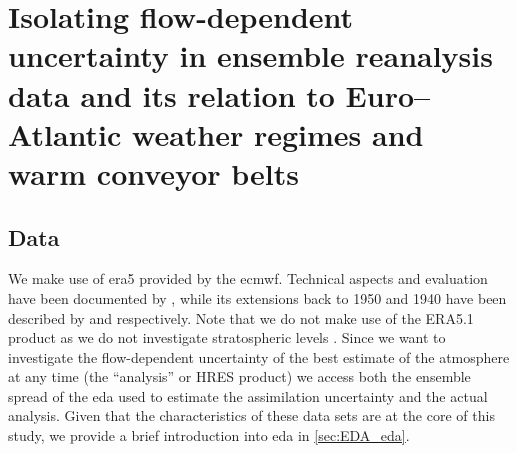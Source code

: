 
\chapter[Assimilation uncertainty, weather regimes and warm conveyor belts]{Isolating flow-dependent uncertainty in ensemble reanalysis data and
  its relation to Euro--Atlantic weather regimes and warm conveyor belts} %
\label{ch:weatherRegimes}


\section{Data}\label{sec:EDA_dat}

We make use of \gls{era5} provided by the \gls{ecmwf}. Technical aspects and evaluation have been documented by \textcite{hersbachERA5GlobalReanalysis2020}, while its extensions back to 1950 and 1940 have been described by \textcite{sociERA5GlobalReanalysis2024} and \textcite{bellERA5GlobalReanalysis2021} respectively. Note that we do not make use of the ERA5.1 product as we do not investigate stratospheric levels \parencite{simmonsGlobalStratosphericTemperature2020}. Since we want to investigate the flow-dependent uncertainty of the best estimate of the atmosphere at any time (the \enquote{analysis} or HRES product) we access both the ensemble spread of the \gls{eda} used to estimate the assimilation uncertainty and the actual analysis. Given that the characteristics of these data sets are at the core of this study, we provide a brief introduction into \gls{eda} in \cref{sec:EDA_eda}.

